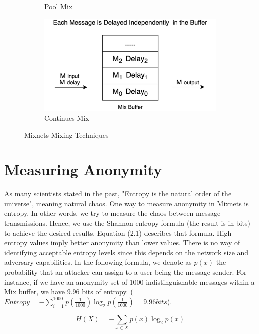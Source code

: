 \documentclass[logo,msc,cyber]{infthesis}   %
\begin{document}
\begin{figure}[h!]
\begin{subfigure}[b]{0.45\textwidth}
        \caption{Pool Mix}
        \label{fig:Pool Mix}
    \end{subfigure}
    \hfill
    \begin{subfigure}[b]{0.45\textwidth}
        \centering
        \includegraphics[width=\textwidth]{figures/mixing_techniques/continues.png}
        \caption{Continues Mix}
        \label{fig:Continues Mix}
    \end{subfigure}
       \caption{Mixnets Mixing Techniques}
       \label{fig:mixnets-mixing-techniques}
 \end{figure}

\section{Measuring Anonymity}

As many scientists stated in the past, "Entropy is the natural order of the
universe", meaning natural chaos. One way to measure anonymity in Mixnets is
entropy. In other words, we try to measure the chaos between message
transmissions. Hence, we use the Shannon entropy formula (the result is in bits)
to achieve the desired results. Equation (2.1) describes that formula. High
entropy values imply better anonymity than lower values. There is no way of
identifying acceptable entropy levels since this depends on the network size and
adversary capabilities. In the following formula, we denote as $p(x)$ the
probability that an attacker can assign to a user being the message sender. For
instance, if we have an anonymity set of 1000 indistinguishable messages within
a Mix buffer, we have 9.96 bits of entropy. ($Entropy = -\sum_{i =
1}^{1000}p(\frac{1}{1000}) \log_2p(\frac{1}{1000}) = 9.96 bits$). 

\begin{equation}
    \label{eq:entropy}
    H(X) = -\sum_{x \in X} p(x) \log_2p(x)     
\end{equation}
\end{document}
